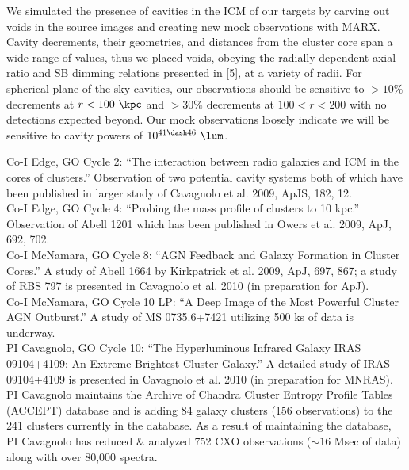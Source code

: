 \documentclass[letterpaper,11pt]{article}
\begin{document}
We simulated the presence of cavities in the ICM of our targets by
carving out voids in the source images and creating new mock
observations with MARX. Cavity decrements, their geometries, and
distances from the cluster core span a wide-range of values, thus we
placed voids, obeying the radially dependent axial ratio and SB
dimming relations presented in [5], at a variety of radii. For
spherical plane-of-the-sky cavities, our observations should be
sensitive to $> 10\%$ decrements at $r < 100 ~\kpc$ and $> 30\%$
decrements at $100 < r < 200$ with no detections expected beyond. Our
mock observations loosely indicate we will be sensitive to cavity
powers of $10^{41 \dash 46} ~\lum$. \vspace{5.5pt}

\small
\noindent 
\normalsize

\clearpage
{}\vspace{5.5pt}

Co-I Edge, GO Cycle 2: ``The interaction between radio galaxies and
ICM in the cores of clusters.'' Observation of two potential cavity
systems both of which have been published in larger study of Cavagnolo
et al. 2009, ApJS, 182, 12.\\

Co-I Edge, GO Cycle 4: ``Probing the mass profile of clusters to 10
kpc.'' Observation of Abell 1201 which has been published in Owers et
al. 2009, ApJ, 692, 702.\\

Co-I McNamara, GO Cycle 8: ``AGN Feedback and Galaxy Formation in
Cluster Cores.'' A study of Abell 1664 by Kirkpatrick et al. 2009,
ApJ, 697, 867; a study of RBS 797 is presented in Cavagnolo et
al. 2010 (in preparation for ApJ).\\

Co-I McNamara, GO Cycle 10 LP: ``A Deep Image of the Most Powerful
Cluster AGN Outburst.'' A study of MS 0735.6+7421 utilizing 500 ks of
data is underway.\\

PI Cavagnolo, GO Cycle 10: ``The Hyperluminous Infrared Galaxy IRAS
09104+4109: An Extreme Brightest Cluster Galaxy.'' A detailed study of
IRAS 09104+4109 is presented in Cavagnolo et al. 2010 (in preparation
for MNRAS).\\

PI Cavagnolo maintains the Archive of Chandra Cluster Entropy Profile
Tables (ACCEPT) database and is adding 84 galaxy clusters (156
observations) to the 241 clusters currently in the database. As a
result of maintaining the database, PI Cavagnolo has reduced \&
analyzed 752 CXO observations ($\sim 16$ Msec of data) along with over
80,000 spectra.
\end{document}
